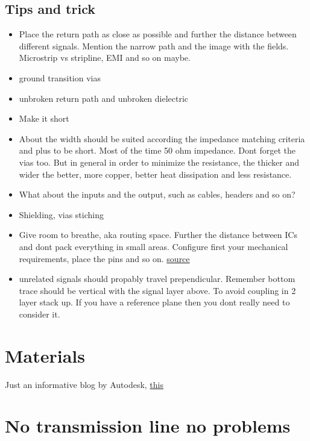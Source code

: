 \documentclass[12pt]{article}
\begin{document}
\subsection{Tips and trick}
\begin{itemize}
		\item Place the return path as close as possible and further the distance between different signals. Mention the narrow path and the image with the fields. Microstrip vs stripline, EMI and so on maybe.
		\item ground transition vias
		\item unbroken return path and unbroken dielectric
		\item Make it short
		\item About the width should be suited according the impedance matching criteria and plus to be short. Most of the time 50 ohm impedance. Dont forget the vias too. But in general in order to minimize the resistance, the thicker and wider the better, more copper, better heat dissipation and less resistance.
		\item What about the inputs and the output, such as cables, headers and so on?
		\item Shielding, vias stiching
		\item Give room to breathe, aka routing space. Further the distance between ICs and dont pack everything in small areas. Configure first your mechanical requirements, place the pins and so on. \href{https://www.autodesk.com/products/eagle/blog/top-10-pcb-component-placement-tips-pcb-beginner/}{source}
		\item unrelated signals should propably travel prependicular. Remember bottom trace should be vertical with the signal layer above. To avoid coupling in 2 layer stack up. If you have a reference plane then you dont really need to consider it.
\end{itemize}

\section{Materials}

Just an informative blog by Autodesk, \href{https://www.autodesk.com/products/eagle/blog/top-10-tips-high-speed-pcb-design/}{this}

\section{No transmission line no problems}
\end{document}
